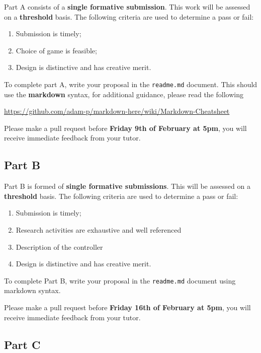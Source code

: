 \documentclass{../../fal_assignment}
\begin{document}
	Part A consists of a \textbf{single formative submission}. This work will be assessed on a \textbf{threshold} basis. The following criteria are used to determine a pass or fail:
	
	\begin{enumerate}[label=(\alph*)]
		\item Submission is timely;
		\item Choice of game is feasible;
		\item Design is distinctive and has creative merit.
	\end{enumerate}
	
	To complete part A, write your proposal in the \texttt{readme.md} document. This should use the \textbf{markdown} syntax, for additional guidance, please read the following  
	
	\indent \url{https://github.com/adam-p/markdown-here/wiki/Markdown-Cheatsheet}
	
	Please make a pull request before \textbf{Friday 9th of February at 5pm}, you will receive immediate feedback from your tutor. 
	
	\subsection*{Part B}
	
	Part B is formed of \textbf{single formative submissions}. This will be assessed on a \textbf{threshold} basis. The following criteria are used to determine a pass or fail:
	
	\begin{enumerate}[label=(\alph*)]
		\item Submission is timely;
		\item Research activities are exhaustive and well referenced
		\item Description of the controller 
		\item Design is distinctive and has creative merit.
	\end{enumerate}
	
	To complete Part B, write your proposal in the \texttt{readme.md} document using markdown syntax.
	
	Please make a pull request before \textbf{Friday 16th of February at 5pm}, you will receive immediate feedback from your tutor. 
	
	\subsection*{Part C}
	
\end{document}
